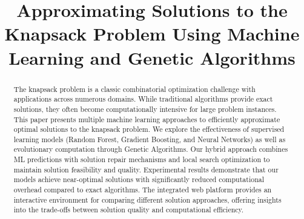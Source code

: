 \documentclass[conference, a4paper]{IEEEtran}
\begin{document}
\title{Approximating Solutions to the Knapsack Problem Using Machine Learning and Genetic Algorithms}

\author{
\and
{}
\and
{}
\and
{}
}

\maketitle

\begin{abstract}
The knapsack problem is a classic combinatorial optimization challenge with applications across numerous domains. While traditional algorithms provide exact solutions, they often become computationally intensive for large problem instances. This paper presents multiple machine learning approaches to efficiently approximate optimal solutions to the knapsack problem. We explore the effectiveness of supervised learning models (Random Forest, Gradient Boosting, and Neural Networks) as well as evolutionary computation through Genetic Algorithms. Our hybrid approach combines ML predictions with solution repair mechanisms and local search optimization to maintain solution feasibility and quality. Experimental results demonstrate that our models achieve near-optimal solutions with significantly reduced computational overhead compared to exact algorithms. The integrated web platform provides an interactive environment for comparing different solution approaches, offering insights into the trade-offs between solution quality and computational efficiency.
\end{abstract}
\end{document}
